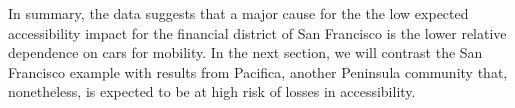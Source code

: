 
In summary, the data suggests that a major cause for the the low expected accessibility impact for the financial district of San Francisco is the lower relative dependence on cars for mobility. In the next section, we will contrast the San Francisco example with results from Pacifica, another Peninsula community that, nonetheless, is expected to be at high risk of losses in accessibility.